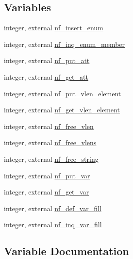 \subsection*{Variables}
\begin{DoxyCompactItemize}
\item 
integer, external \hyperlink{namespacenetcdf4__nf__interfaces_a1e892cb2a8ec57c37cc14571da968d08}{nf\+\_\+insert\+\_\+enum}
\item 
integer, external \hyperlink{namespacenetcdf4__nf__interfaces_a7701386d944a559ae2c66e83e2973318}{nf\+\_\+inq\+\_\+enum\+\_\+member}
\item 
integer, external \hyperlink{namespacenetcdf4__nf__interfaces_a3a7bd7be950c6922e8f88678b4bfdf8a}{nf\+\_\+put\+\_\+att}
\item 
integer, external \hyperlink{namespacenetcdf4__nf__interfaces_abb9bde5027d3ac2c489b0a972dcb6198}{nf\+\_\+get\+\_\+att}
\item 
integer, external \hyperlink{namespacenetcdf4__nf__interfaces_a66368d19b7489f6051a9bfc57f6c6fe5}{nf\+\_\+put\+\_\+vlen\+\_\+element}
\item 
integer, external \hyperlink{namespacenetcdf4__nf__interfaces_a81bf2e69498696b98324738ee6f43829}{nf\+\_\+get\+\_\+vlen\+\_\+element}
\item 
integer, external \hyperlink{namespacenetcdf4__nf__interfaces_a79bedc621cc77df74b1d2af59c274a6c}{nf\+\_\+free\+\_\+vlen}
\item 
integer, external \hyperlink{namespacenetcdf4__nf__interfaces_acd6178ea9e84f98d21b275192fc6c611}{nf\+\_\+free\+\_\+vlens}
\item 
integer, external \hyperlink{namespacenetcdf4__nf__interfaces_a37497a28283a014b32835857d07519a5}{nf\+\_\+free\+\_\+string}
\item 
integer, external \hyperlink{namespacenetcdf4__nf__interfaces_a9d318b0273c1b17703f13ac2bddf9c52}{nf\+\_\+put\+\_\+var}
\item 
integer, external \hyperlink{namespacenetcdf4__nf__interfaces_a8658e94b204c7977d7e6c083d20f9426}{nf\+\_\+get\+\_\+var}
\item 
integer, external \hyperlink{namespacenetcdf4__nf__interfaces_a806f80a9cb5a64ad0498074b159b4569}{nf\+\_\+def\+\_\+var\+\_\+fill}
\item 
integer, external \hyperlink{namespacenetcdf4__nf__interfaces_a2cd40ac572052bbd28dd915f9089b77f}{nf\+\_\+inq\+\_\+var\+\_\+fill}
\end{DoxyCompactItemize}


\subsection{Variable Documentation}
\mbox{\label{namespacenetcdf4__nf__interfaces_a806f80a9cb5a64ad0498074b159b4569}} 
